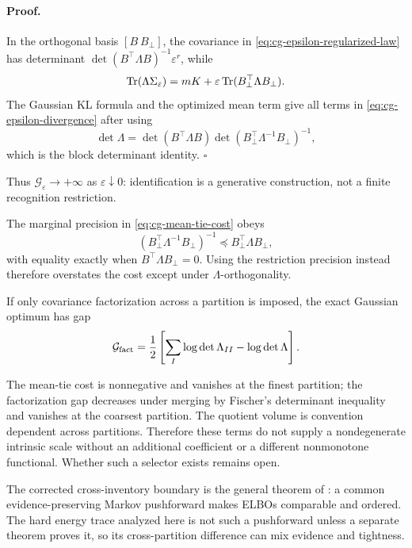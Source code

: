 \paragraph{Proof.}
In the orthogonal basis \([B\ B_\perp]\), the covariance in
\eqref{eq:cg-epsilon-regularized-law} has determinant
\(\det(B^\top\Lambda B)^{-1}\varepsilon^r\), while
\[
\operatorname{Tr}(\Lambda\Sigma_\varepsilon)
=mK+\varepsilon\operatorname{Tr}(B_\perp^\top\Lambda B_\perp).
\]
The Gaussian KL formula and the optimized mean term give all terms in
\eqref{eq:cg-epsilon-divergence} after using
\[
\det\Lambda
=\det(B^\top\Lambda B)
\det\left(B_\perp^\top\Lambda^{-1}B_\perp\right)^{-1},
\]
which is the block determinant identity. \(\square\)

Thus \(\mathcal G_\varepsilon\to+\infty\) as
\(\varepsilon\downarrow0\): identification is a generative construction, not
a finite recognition restriction.

The marginal precision in \eqref{eq:cg-mean-tie-cost} obeys
\begin{equation}
\left(B_\perp^\top\Lambda^{-1}B_\perp\right)^{-1}
\preceq B_\perp^\top\Lambda B_\perp,
\label{eq:cg-loewner}
\end{equation}
with equality exactly when
\(B^\top\Lambda B_\perp=0\). Using the restriction precision instead
therefore overstates the cost except under \(\Lambda\)-orthogonality.

If only covariance factorization across a partition is imposed, the exact
Gaussian optimum has gap
\begin{equation}
\mathcal G_{\rm fact}
=\frac12\left[
\sum_I\log\det\Lambda_{II}-\log\det\Lambda
\right].
\label{eq:cg-factorization-gap}
\end{equation}

The mean-tie cost is nonnegative and vanishes at the
finest partition; the factorization gap decreases under merging by Fischer's
determinant inequality and vanishes at the coarsest partition. The quotient
volume is convention dependent across partitions. Therefore these terms do
not supply a nondegenerate intrinsic scale without an additional coefficient
or a different nonmonotone functional. Whether such a selector exists remains
open. 

The corrected cross-inventory boundary is the general theorem of
: a common evidence-preserving Markov pushforward makes
ELBOs comparable and ordered. The hard energy trace analyzed here is not such
a pushforward unless a separate theorem proves it, so its cross-partition
difference can mix evidence and tightness. 

